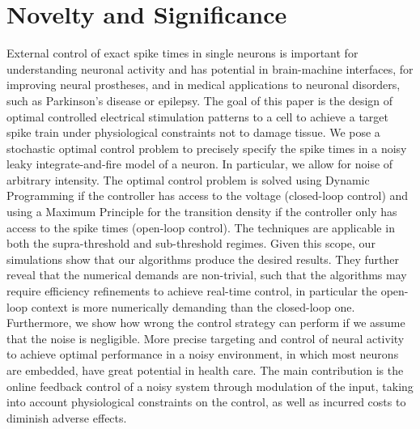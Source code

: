 \documentclass[12pt]{iopart}
\begin{document}
\section{Novelty and Significance}
External control of exact spike times in single neurons is important for
understanding neuronal activity and has potential in brain-machine interfaces,
for improving neural prostheses, and in medical applications to neuronal
disorders, such as Parkinson's disease or epilepsy. The goal of this paper is
the design of optimal controlled electrical stimulation patterns to a cell to
achieve a target spike train under physiological constraints not to damage
tissue. We pose a stochastic optimal control problem to precisely specify the
spike times in a noisy leaky integrate-and-fire model of a neuron. In
particular, we allow for noise of arbitrary intensity. The optimal control
problem is solved using Dynamic Programming if the controller has access to the
voltage (closed-loop control) and using a Maximum Principle for the transition
density if the controller only has access to the spike times (open-loop
control). The techniques are applicable in both the supra-threshold and
sub-threshold regimes. Given this scope, our simulations show that our
algorithms produce the desired results. They further reveal that the numerical
demands are non-trivial, such that the algorithms may require efficiency
refinements to achieve real-time control, in particular the open-loop context is
more numerically demanding than the closed-loop one. Furthermore, we show how
wrong the control strategy can perform if we assume that the noise is
negligible.  More precise targeting and control of neural activity to achieve
optimal performance in a noisy environment, in which most neurons are embedded,
have great potential in health care. The main contribution is the online
feedback control of a noisy system through modulation of the input, taking into
account physiological constraints on the control, as well as incurred costs to
diminish adverse effects.
\end{document}
